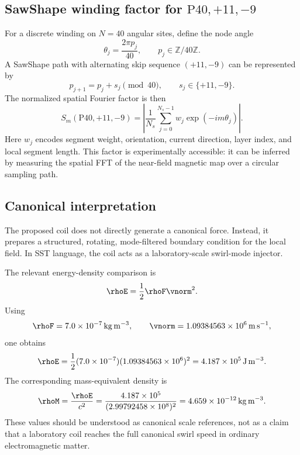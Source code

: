 \subsection{SawShape winding factor for \texorpdfstring{$\mathrm{P40},+11,-9$}{P40,+11,-9}}

For a discrete winding on $N=40$ angular sites, define the node angle
\begin{equation}
\theta_j=\frac{2\pi p_j}{40},
\qquad p_j\in\mathbb{Z}/40\mathbb{Z}.
\end{equation}
A SawShape path with alternating skip sequence $(+11,-9)$ can be represented by
\begin{equation}
p_{j+1}
=
p_j + s_j
\pmod{40},
\qquad
s_j\in\{+11,-9\}.
\end{equation}
The normalized spatial Fourier factor is then
\begin{equation}
\boxed{
S_m(\mathrm{P40},+11,-9)
=
\left|
\frac{1}{N_s}
\sum_{j=0}^{N_s-1}
w_j
\exp(-i m \theta_j)
\right|
}.
\label{eq:appendix_sawshape_factor}
\end{equation}
Here $w_j$ encodes segment weight, orientation, current direction, layer index, and local segment length. This factor is experimentally accessible: it can be inferred by measuring the spatial FFT of the near-field magnetic map over a circular sampling path.

\subsection{Canonical interpretation}

The proposed coil does not directly generate a canonical force. Instead, it prepares a structured, rotating, mode-filtered boundary condition for the local field. In SST language, the coil acts as a laboratory-scale swirl-mode injector.

The relevant energy-density comparison is
\begin{equation}
\rhoE
=
\frac{1}{2}\rhoF \vnorm^2.
\end{equation}
Using
\[
\rhoF = 7.0\times10^{-7}\,\mathrm{kg\,m^{-3}},
\qquad
\vnorm = 1.09384563\times10^{6}\,\mathrm{m\,s^{-1}},
\]
one obtains
\begin{equation}
\rhoE
=
\frac{1}{2}
(7.0\times10^{-7})
(1.09384563\times10^{6})^2
=
4.187\times10^{5}\,\mathrm{J\,m^{-3}}.
\end{equation}
The corresponding mass-equivalent density is
\begin{equation}
\rhoM
=
\frac{\rhoE}{c^2}
=
\frac{4.187\times10^{5}}
{(2.99792458\times10^{8})^2}
=
4.659\times10^{-12}\,\mathrm{kg\,m^{-3}}.
\end{equation}
These values should be understood as canonical scale references, not as a claim that a laboratory coil reaches the full canonical swirl speed in ordinary electromagnetic matter.

